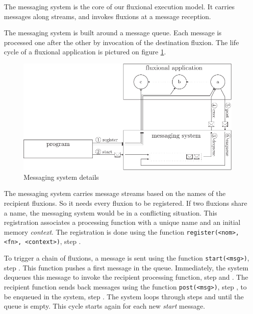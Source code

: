 The messaging system is the core of our fluxional execution model.
It carries messages along streams, and invokes fluxions at a message reception.

The messaging system is built around a message queue.
Each message is processed one after the other by invocation of the destination fluxion.
The life cycle of a fluxional application is pictured on figure \ref{fig:MesSys}.

\begin{figure}[h!]
  \includegraphics[width=\linewidth]{ressources/schema-message.pdf}
  \caption{Messaging system details}
  \label{fig:MesSys}
\end{figure}

The messaging system carries message streams based on the names of the recipient fluxions.
So it needs every fluxion to be registered.
If two fluxions share a name, the messaging system would be in a conflicting situation.
This registration associates a processing function with a unique name and an initial memory \textit{context}.
The registration is done using the function \texttt{register(<nom>, <fn>, <context>)}, step .

To trigger a chain of fluxions, a message is sent using the function \texttt{start(<msg>)}, step .
This function pushes a first message in the queue.
Immediately, the system dequeues this message to invoke the recipient processing function, step  and .
The recipient function sends back messages using the function \texttt{post(<msg>)}, step , to be enqueued in the system, step .
The system loops through steps  and  until the queue is empty.
This cycle starts again for each new \textit{start} message.

